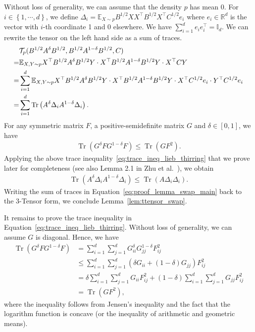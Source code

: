 \documentclass[11pt,twoside]{article}
\newcommand{\ttensor}{\mathcal{T}}
\theoremstyle{named}
\theoremstyle{plain}
\newcommand{\Exs}{\ensuremath{{\mathbb{E}}}}
\newcommand{\usedim}{\ensuremath{d}}
\newcommand{\dims}{\usedim}
\DeclareMathOperator{\trace}{Tr}
\newcommand{\Ind}{\ensuremath{\mathbb{I}}}
\newcommand{\real}{\ensuremath{\mathbb{R}}}
\newcommand{\parenth}[1]{\left( #1 \right)}
\newcommand{\braces}[1]{\left\{ #1 \right \}}
\newcommand{\tp}{^\top}
\begin{document}
Without loss of generality, we can assume that the density $p$ has mean $0$. For $i \in \braces{1, \cdots, \dims}$, we define $\Delta_i = \Exs_{X\sim p} B^{1/2} X X \tp B^{1/2} X\tp C^{1/2} e_i$ where $e_i \in \real^\dims$ is the vector with $i$-th coordinate 1 and 0 elsewhere. We have $\sum_{i=1}^\dims e_i e_i \tp  = \Ind_\dims$. We can rewrite the tensor on the left hand side as a sum of traces.
\begin{align}
  \label{eq:proof_lemma_swap_main}
  &\ttensor_{p}(B^{1/2}A^\delta B^{1/2}, B^{1/2}A^{1-\delta}B^{1/2}, C) \notag \\
  =& \Exs_{X, Y \sim p} X\tp B^{1/2}A^\delta B^{1/2} Y \cdot X\tp B^{1/2}A^{1-\delta}B^{1/2} Y \cdot X \tp C Y \notag \\
  =& \sum_{i=1}^\dims \Exs_{X, Y \sim p} X\tp B^{1/2}A^\delta B^{1/2} Y \cdot X\tp B^{1/2}A^{1-\delta}B^{1/2} Y \cdot X\tp C^{1/2} e_i \cdot Y\tp C^{1/2} e_i \notag \\
  =& \sum_{i=1}^\dims \trace\parenth{A^{\delta} \Delta_i A^{1-\delta} \Delta_i}.
\end{align}
For any symmetric matrix $F$, a positive-semidefinite matrix $G$ and $\delta \in [0, 1]$, we have
\begin{align}
  \label{eq:trace_ineq_lieb_thirring}
  \trace\parenth{G^\delta F G^{1-\delta} F} \leq \trace\parenth{G F^2}.
\end{align}
Applying the above trace inequality~\eqref{eq:trace_ineq_lieb_thirring} that we prove later for completeness (see also Lemma 2.1 in Zhu et al.~\cite{allen2016using}),
we obtain
\begin{align*}
  \trace\parenth{A^{\delta} \Delta_i A^{1-\delta} \Delta_i} \leq \trace\parenth{A \Delta_i \Delta_i}.
\end{align*}
Writing the sum of traces in Equation~\eqref{eq:proof_lemma_swap_main} back to the 3-Tensor form, we conclude Lemma~\ref{lem:ttensor_swap}.

It remains to prove the trace inequality in Equation~\eqref{eq:trace_ineq_lieb_thirring}. Without loss of generality, we can assume $G$ is diagonal. Hence, we have
\begin{align*}
  \trace\parenth{G^\delta F G^{1-\delta} F} &= \sum_{i = 1}^\dims \sum_{j = 1}^\dims G_{ii}^\delta G_{jj}^{1-\delta} F_{ij}^2 \\
  &\leq \sum_{i=1}^\dims \sum_{j=1}^\dims \parenth{\delta G_{ii} + (1-\delta) G_{jj}} F_{ij}^2 \\
  &= \delta \sum_{i=1}^\dims \sum_{j=1}^\dims G_{ii} F_{ij}^2 + (1-\delta) \sum_{i=1}^\dims \sum_{j=1}^\dims G_{jj} F_{ij}^2 \\
  &= \trace\parenth{G F^2},
\end{align*}
where the inequality follows from Jensen's inequality and the fact that the logarithm function is concave (or the inequality of arithmetic and geometric means).
\end{document}
